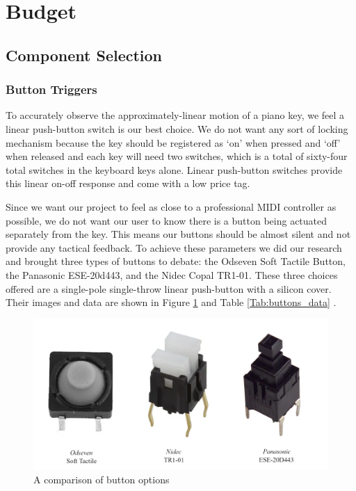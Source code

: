 \section{Budget}
\subsection{Component Selection}
\subsubsection{Button Triggers}
To accurately observe the approximately-linear motion of a piano key, we feel a linear push-button switch is our best choice. We do not want any sort of locking mechanism because the key should be registered as ‘on’ when pressed and ‘off’ when released and each key will need two switches, which is a total of sixty-four total switches in the keyboard keys alone. Linear push-button switches provide this linear on-off response and come with a low price tag.

Since we want our project to feel as close to a professional MIDI controller as possible, we do not want our user to know there is a button being actuated separately from the key. This means our buttons should be almost silent and not provide any tactical feedback. To achieve these parameters we did our research and brought three types of buttons to debate: the Odseven Soft Tactile Button, the Panasonic ESE-20d443, and the Nidec Copal TR1-01. These three choices offered are a single-pole single-throw linear push-button with a silicon cover. Their images and data are shown in Figure \ref{fig:buttons_fig} and Table \ref{Tab:buttons_data} .

\begin{figure}[h!]
  \centering
  \includegraphics[width=\linewidth]{image/Buttons.png}
  \caption{A comparison of button options}
  \label{fig:buttons_fig}
\end{figure}

